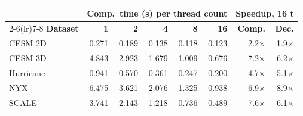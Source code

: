 \begin{tabular}{@{}lrrrrrrr@{}}
\toprule
 & \multicolumn{5}{c}{\textbf{Comp.\ time (s) per thread count}} & \multicolumn{2}{c}{\textbf{Speedup, 16 t}} \\
\cmidrule(lr){2-6}\cmidrule(lr){7-8}
\textbf{Dataset} & \textbf{1} & \textbf{2} & \textbf{4} & \textbf{8} & \textbf{16} & \textbf{Comp.} & \textbf{Dec.} \\
\midrule
CESM 2D & 0.271 & 0.189 & 0.138 & 0.118 & 0.123 & 2.2$\times$ & 1.9$\times$ \\
CESM 3D & 4.843 & 2.923 & 1.679 & 1.009 & 0.676 & 7.2$\times$ & 6.2$\times$ \\
Hurricane & 0.941 & 0.570 & 0.361 & 0.247 & 0.200 & 4.7$\times$ & 5.1$\times$ \\
NYX & 6.475 & 3.621 & 2.076 & 1.325 & 0.938 & 6.9$\times$ & 8.9$\times$ \\
SCALE & 3.741 & 2.143 & 1.218 & 0.736 & 0.489 & 7.6$\times$ & 6.1$\times$ \\
\bottomrule
\end{tabular}
